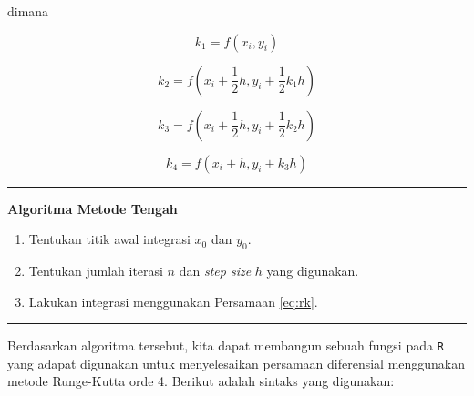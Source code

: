 \documentclass[]{book}
\providecommand{\tightlist}{%
  \setlength{\itemsep}{0pt}\setlength{\parskip}{0pt}}
\theoremstyle{definition}
\theoremstyle{definition}
\theoremstyle{definition}
\theoremstyle{remark}
\begin{document}
dimana

\begin{equation}
k_1=f\left(x_i,y_i\right)
  \label{eq:rk1}
\end{equation}

\begin{equation}
k_2=f\left(x_i+\frac{1}{2}h,y_i+\frac{1}{2}k_1h\right)
  \label{eq:rk2}
\end{equation}

\begin{equation}
k_3=f\left(x_i+\frac{1}{2}h,y_i+\frac{1}{2}k_2h\right)
  \label{eq:rk3}
\end{equation}

\begin{equation}
k_4=f\left(x_i+h,y_i+k_3h\right)
  \label{eq:rk4}
\end{equation}

\begin{center}\rule{0.5\linewidth}{\linethickness}\end{center}

\textbf{Algoritma Metode Tengah}

\begin{enumerate}
\def\labelenumi{\arabic{enumi}.}
\tightlist
\item
  Tentukan titik awal integrasi \(x_0\) dan \(y_0\).
\item
  Tentukan jumlah iterasi \(n\) dan \emph{step size} \(h\) yang digunakan.
\item
  Lakukan integrasi menggunakan Persamaan \eqref{eq:rk}.
\end{enumerate}

\begin{center}\rule{0.5\linewidth}{\linethickness}\end{center}

Berdasarkan algoritma tersebut, kita dapat membangun sebuah fungsi pada \texttt{R} yang adapat digunakan untuk menyelesaikan persamaan diferensial menggunakan metode Runge-Kutta orde 4. Berikut adalah sintaks yang digunakan:
\end{document}

